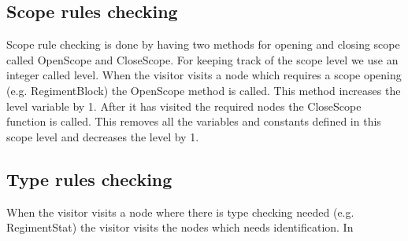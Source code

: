 	\subsection{Scope rules checking}
		Scope rule checking is done by having two methods for opening and closing scope called OpenScope and CloseScope. 
		For keeping track of the scope level we use an integer called level.
		When the visitor visits a node which requires a scope opening (e.g. RegimentBlock) the OpenScope method is called. 
		This method increases the level variable by 1. After it has visited the required nodes the CloseScope function is called. 
		This removes all the variables and constants defined in this scope level and decreases the level by 1.
	
	\subsection{Type rules checking}
		When the visitor visits a node where there is type checking needed (e.g. RegimentStat) the visitor visits the nodes 
		which needs identification. In 
		
		